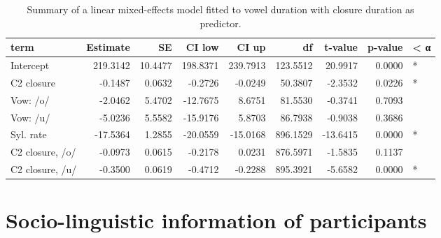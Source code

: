 \documentclass[preprint]{JASAnew}
\begin{document}
\begin{table}

\caption{\label{tab:vow-clo-table}Summary of a linear mixed-effects model fitted to vowel duration with closure duration as predictor.}
\centering
\begin{tabular}[t]{lrrrrrrrl}
\toprule
term & Estimate & SE & CI low & CI up & df & t-value & p-value & < α\\
\midrule
Intercept & 219.3142 & 10.4477 & 198.8371 & 239.7913 & 123.5512 & 20.9917 & 0.0000 & *\\
C2 closure & -0.1487 & 0.0632 & -0.2726 & -0.0249 & 50.3807 & -2.3532 & 0.0226 & *\\
Vow: /o/ & -2.0462 & 5.4702 & -12.7675 & 8.6751 & 81.5530 & -0.3741 & 0.7093 & \\
Vow: /u/ & -5.0236 & 5.5582 & -15.9176 & 5.8703 & 86.7938 & -0.9038 & 0.3686 & \\
Syl. rate & -17.5364 & 1.2855 & -20.0559 & -15.0168 & 896.1529 & -13.6415 & 0.0000 & *\\
\addlinespace
C2 closure, /o/ & -0.0973 & 0.0615 & -0.2178 & 0.0231 & 876.5971 & -1.5835 & 0.1137 & \\
C2 closure, /u/ & -0.3500 & 0.0619 & -0.4712 & -0.2288 & 895.3921 & -5.6582 & 0.0000 & *\\
\bottomrule
\end{tabular}
\end{table}

\hypertarget{socio-linguistic-information-of-participants}{%
\section{Socio-linguistic information of
participants}\label{socio-linguistic-information-of-participants}}

\label{a:socioling}
\end{document}
